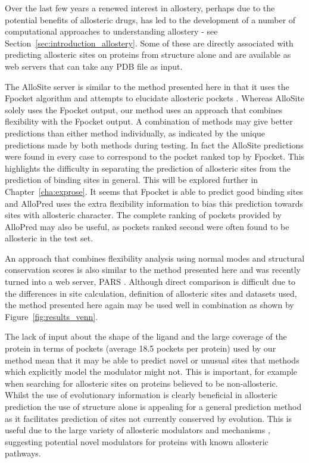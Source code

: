 Over the last few years a renewed interest in allostery, perhaps due to the potential benefits of allosteric drugs, has led to the development of a number of computational approaches to understanding allostery - see Section~\ref{sec:introduction_allostery}.
Some of these are directly associated with predicting allosteric sites on proteins from structure alone and are available as web servers that can take any PDB file as input.

The AlloSite server is similar to the method presented here in that it uses the Fpocket algorithm and attempts to elucidate allosteric pockets \cite{Huang2013}.
Whereas AlloSite solely uses the Fpocket output, our method uses an approach that combines flexibility with the Fpocket output.
A combination of methods may give better predictions than either method individually, as indicated by the unique predictions made by both methods during testing.
In fact the AlloSite predictions were found in every case to correspond to the pocket ranked top by Fpocket.
This highlights the difficulty in separating the prediction of allosteric sites from the prediction of binding sites in general.
This will be explored further in Chapter~\ref{cha:exprose}.
It seems that Fpocket is able to predict good binding sites and AlloPred uses the extra flexibility information to bias this prediction towards sites with allosteric character.
The complete ranking of pockets provided by AlloPred may also be useful, as pockets ranked second were often found to be allosteric in the test set.

An approach that combines flexibility analysis using normal modes and structural conservation scores \cite{Panjkovich2012} is also similar to the method presented here and  was recently turned into a web server, PARS \cite{Panjkovich2014}.
Although direct comparison is difficult due to the differences in site calculation, definition of allosteric sites and datasets used, the method presented here again may be used well in combination as shown by Figure~\ref{fig:results_venn}.

The lack of input about the shape of the ligand and the large coverage of the protein in terms of pockets (average 18.5 pockets per protein) used by our method mean that it may be able to predict novel or unusual sites that methods which explicitly model the modulator might not.
This is important, for example when searching for allosteric sites on proteins believed to be non-allosteric.
Whilst the use of evolutionary information is clearly beneficial in allosteric prediction \cite{Reynolds2011} the use of structure alone is appealing for a general prediction method as it facilitates prediction of sites not currently conserved by evolution.
This is useful due to the large variety of allosteric modulators \cite{Wang2012} and mechanisms \cite{Motlagh2014}, suggesting potential novel modulators for proteins with known allosteric pathways.

